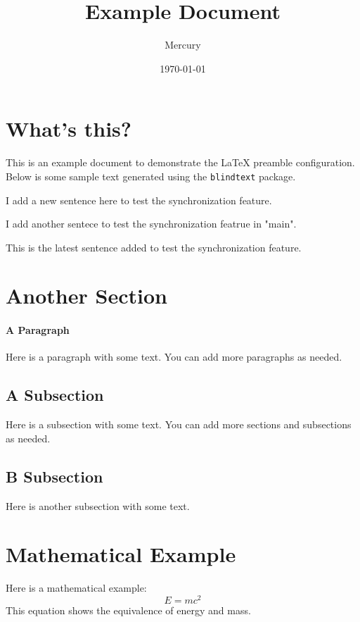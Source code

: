 \documentclass[12pt]{article}     %
\title{Example Document}
\author{Mercury}
\date{\today}
\begin{document}
\maketitle

\tableofcontents    %
\newpage

% 
% 

\section{What's this?} %
This is an example document to demonstrate the LaTeX preamble configuration. Below is some sample text generated using the \texttt{blindtext} package.

I add a new sentence here to test the synchronization feature.

I add another sentece to test the synchronization featrue in "main".

This is the latest sentence added to test the synchronization feature.

\section{Another Section} 
\blindtext[2]  %

\paragraph{A Paragraph} %
Here is a paragraph with some text. You can add more paragraphs as needed.

\subsection{A Subsection} %
Here is a subsection with some text. You can add more sections and subsections as needed.
\blindtext[1]  %
\subsection{B Subsection}
Here is another subsection with some text.\blindtext[1]  %

\section{Mathematical Example}
Here is a mathematical example:
\[
E = mc^2
\]
This equation shows the equivalence of energy and mass.
\end{document}
